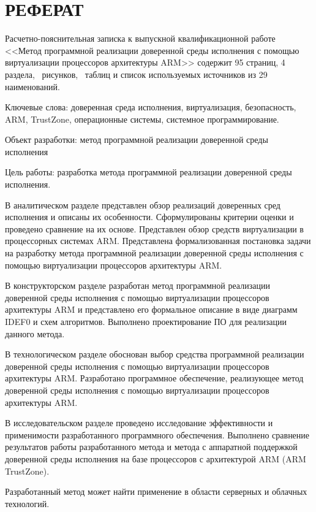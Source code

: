 \section*{РЕФЕРАТ}

Расчетно-пояснительная записка к выпускной квалификационной работе <<Метод программной реализации доверенной среды исполнения с помощью виртуализации процессоров архитектуры ARM>> содержит 95  страниц, 4 раздела, \totalfigures\ рисунков, \totaltables\ таблиц и список используемых источников из 29 наименований.

Ключевые слова: доверенная среда исполнения, виртуализация, безопасность, ARM, TrustZone, операционные системы, системное программирование.

Объект разработки: метод программной реализации доверенной среды исполнения

Цель работы: разработка метода программной реализации доверенной среды исполнения.
 
В аналитическом разделе представлен обзор реализаций доверенных сред исполнения и описаны их особенности. Сформулированы критерии оценки и проведено сравнение на их основе. Представлен обзор средств виртуализации в процессорных системах ARM. Представлена формализованная постановка задачи на разработку метода программной реализации доверенной среды исполнения с помощью виртуализации процессоров архитектуры ARM.

В конструкторском разделе разработан метод программной реализации доверенной среды исполнения с помощью виртуализации процессоров архитектуры ARM и представлено его формальное описание в виде диаграмм IDEF0 и схем алгоритмов. Выполнено проектирование ПО для реализации данного метода.

В технологическом разделе обоснован выбор средства программной реализации доверенной среды исполнения с помощью виртуализации процессоров архитектуры ARM. Разработано программное обеспечение, реализующее метод доверенной среды исполнения с помощью виртуализации процессоров архитектуры ARM.

В исследовательском разделе проведено исследование эффективности и применимости разработанного программного обеспечения. Выполнено сравнение результатов работы разработанного метода и метода с аппаратной поддержкой доверенной среды исполнения на базе процессоров с архитектурой ARM (ARM TrustZone).

Разработанный метод может найти применение в области серверных и облачных технологий.

\pagebreak
